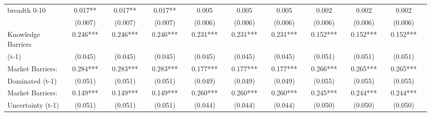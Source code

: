 \begin{table}[htbp]
\begin{tabular}{l*{18}{c}}
breadth 0-10        &       0.017** &               &       0.017** &               &       0.017** &               &       0.005   &               &       0.005   &               &       0.005   &               &       0.002   &               &       0.002   &               &       0.002   &               \\
                    &     (0.007)   &               &     (0.007)   &               &     (0.007)   &               &     (0.006)   &               &     (0.006)   &               &     (0.006)   &               &     (0.006)   &               &     (0.006)   &               &     (0.006)   &               \\
Knowledge Barriers  &       0.246***&               &       0.246***&               &       0.246***&               &       0.231***&               &       0.231***&               &       0.231***&               &       0.152***&               &       0.152***&               &       0.152***&               \\
(t-1)               &     (0.045)   &               &     (0.045)   &               &     (0.045)   &               &     (0.045)   &               &     (0.045)   &               &     (0.045)   &               &     (0.051)   &               &     (0.051)   &               &     (0.051)   &               \\
Market Barriers:    &       0.284***&               &       0.283***&               &       0.283***&               &       0.177***&               &       0.177***&               &       0.177***&               &       0.266***&               &       0.265***&               &       0.265***&               \\
Dominated (t-1)     &     (0.051)   &               &     (0.051)   &               &     (0.051)   &               &     (0.049)   &               &     (0.049)   &               &     (0.049)   &               &     (0.055)   &               &     (0.055)   &               &     (0.055)   &               \\
Market Barriers:    &       0.149***&               &       0.149***&               &       0.149***&               &       0.260***&               &       0.260***&               &       0.260***&               &       0.245***&               &       0.244***&               &       0.244***&               \\
Uncertainty (t-1)   &     (0.051)   &               &     (0.051)   &               &     (0.051)   &               &     (0.044)   &               &     (0.044)   &               &     (0.044)   &               &     (0.050)   &               &     (0.050)   &               &     (0.050)   &               \\

\end{tabular}
\end{table}
